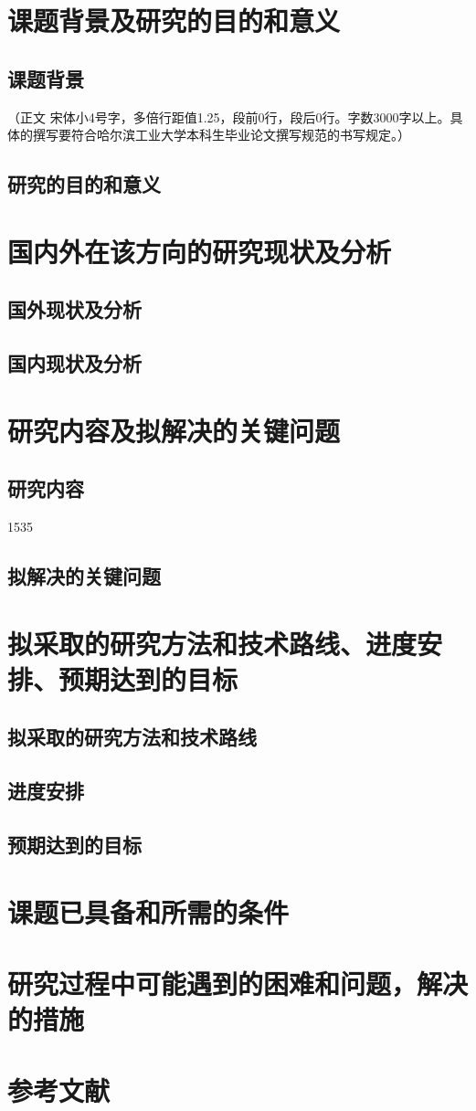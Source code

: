 \section{课题背景及研究的目的和意义}
\subsection{课题背景}
（正文  宋体小4号字，多倍行距值1.25，段前0行，段后0行。字数3000字以上。具体的撰写要符合哈尔滨工业大学本科生毕业论文撰写规范的书写规定。）\cite{hithesis2017}
\subsection{研究的目的和意义}
\section{国内外在该方向的研究现状及分析}
\subsection{国外现状及分析}
\subsection{国内现状及分析}
\section{研究内容及拟解决的关键问题}
\subsection{研究内容}
1535
\subsection{拟解决的关键问题}
\section{拟采取的研究方法和技术路线、进度安排、预期达到的目标}
\subsection{拟采取的研究方法和技术路线}
\subsection{进度安排}
\subsection{预期达到的目标}
\section{课题已具备和所需的条件}
\section{研究过程中可能遇到的困难和问题，解决的措施}
\section{参考文献}



